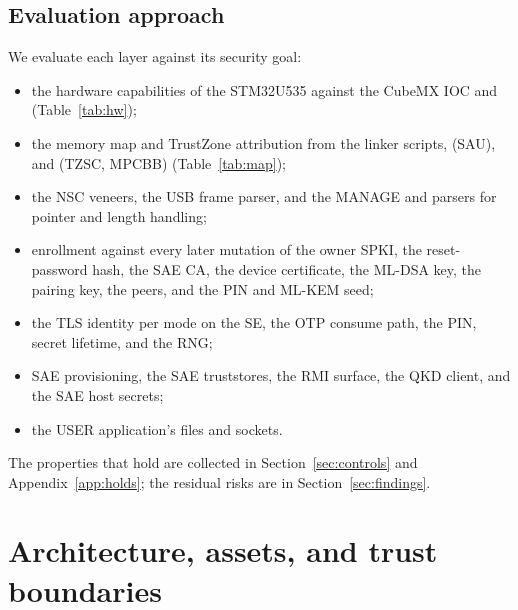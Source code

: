 \documentclass[11pt,a4paper]{article}
\begin{document}
\subsection{Evaluation approach}
We evaluate each layer against its security goal:
\begin{itemize}
\item the hardware capabilities of the STM32U535 against the CubeMX IOC and  (Table~\ref{tab:hw});
\item the memory map and TrustZone attribution from the linker scripts,  (SAU), and  (TZSC, MPCBB) (Table~\ref{tab:map});
\item the NSC veneers, the USB frame parser, and the MANAGE and  parsers for pointer and length handling;
\item enrollment against every later mutation of the owner SPKI, the reset-password hash, the SAE CA, the device certificate, the ML-DSA key, the pairing key, the peers, and the PIN and ML-KEM seed;
\item the TLS identity per mode on the SE, the OTP consume path, the PIN, secret lifetime, and the RNG;
\item SAE provisioning, the SAE truststores, the RMI surface, the QKD client, and the SAE host secrets;
\item the USER application's files and sockets.
\end{itemize}
The properties that hold are collected in Section~\ref{sec:controls} and Appendix~\ref{app:holds}; the residual risks are in Section~\ref{sec:findings}.

\section{Architecture, assets, and trust boundaries}
\end{document}
